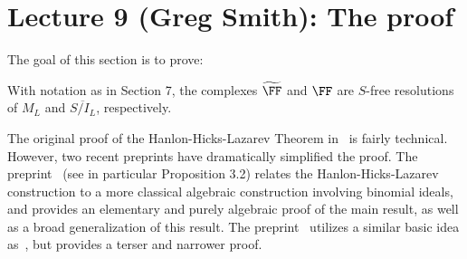 \documentclass{amsart}
\begin{document}
\section{Lecture 9 (Greg Smith): The proof}\label{lec:9-HHL-proof}
The goal of this section is to prove:

\begin{theorem} \cite{HHL}\label{thm:HHL-resolution}
With notation as in Section 7, the complexes $\tF$ and $\FF$ are $S$-free resolutions of $M_{L}$ and $\overline{S/I_{L}}$, respectively. 
\end{theorem}

The original proof of the Hanlon-Hicks-Lazarev Theorem in~\cite{HHL} is fairly technical.  However, two recent preprints have dramatically simplified the proof.  The preprint~\cite{BCHSY} (see in particular Proposition 3.2) relates the Hanlon-Hicks-Lazarev construction to a more classical algebraic construction involving binomial ideals, and provides an elementary and purely algebraic proof of the main result, as well as a broad generalization of this result.  The preprint~\cite{BH25} utilizes a similar basic idea as~\cite{BCHSY}, but provides a terser and narrower proof.
\end{document}
